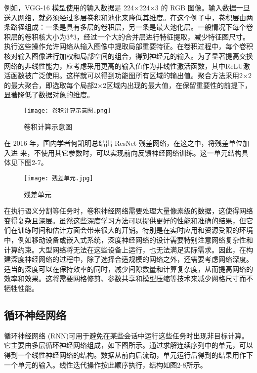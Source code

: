 例如，VGG-16 模型\cite{simonyan2014very}使用的输入数据是 224×224×3 的 RGB 图像。输入数据一旦送入网络，就必须经过多层卷积和池化来降低其维度。在这个例子中，卷积层由两条路径组成：一条是具有多层的卷积层，另一条是最大池化层。一般情况下每个卷积层的卷积核大小为3*3，经过一个大的合并层进行特征提取，减少特征图尺寸。执行这些操作允许网络从输入图像中提取局部重要特征。在卷积过程中，每个卷积核对输入图像进行加权和局部空间的组合，得到神经元的输入。为了显著提高交换网络的非线性能力，应考虑采用更高的输入值作为非线性激活函数，其中ReLU激活函数被广泛使用。这样就可以得到功能图所有区域的输出值。聚合方法采用2×2的最大聚合，即选取每个局部2×2区域内出现的最大值，在保留重要性的前提下，显著降低了数据对象的维度。

\begin{figure}[hbt]
	\centering
	\texttt{[image: 卷积计算示意图.png]}
	\caption{卷积计算示意图}
	\label{f.example}
\end{figure}

在 2016 年，国内学者何凯明总结出 ResNet 残差网络\cite{he2016deep}，在这之中，将残差单位加入进
来，不使用其它参数时，可以实现前向反馈神经网络训练。这一单元结构具体见下图2-7。

\begin{figure}[hbt]
	\centering
	\texttt{[image: 残差单元.jpg]}
	\caption{残差单元}
	\label{f.example}
\end{figure}

在执行语义分割等任务时，卷积神经网络需要处理大量像素级的数据，这使得网络变得复杂且深层。虽然这些深度学习方法可以提供更好的性能和准确的结果，但它们在训练时间和估计方面会带来很大的开销。特别是在实时应用和资源受限的环境中，例如移动设备或嵌入式系统，深度神经网络的设计需要特别注意网络复杂性和计算约束。大型网络将无法在这些设备上运行，也无法满足实际需求。因此，在构建深度神经网络的过程中，除了选择合适规模的网络之外，还需要考虑网络深度。适当的深度可以在保持效率的同时，减少间隙数量和计算复杂度，从而提高网络的效率和效果。这将需要网格修剪、参数共享和模型压缩等技术来减少网格尺寸而不牺牲性能。

\subsection{循环神经网络}

循环神经网络 (RNN)\cite{zaremba2014recurrent}可用于避免在某些会话中运行这些任务时出现非目标计算。它主要由多层循环神经网络组成，如下图所示。通过求解连续序列中的单元，可以得到一个线性神经网络的结构。数据从前向后流动，单元运行后得到的结果用作下一个单元的输入。线性迭代操作按此顺序执行，结构如图2-8所示。

